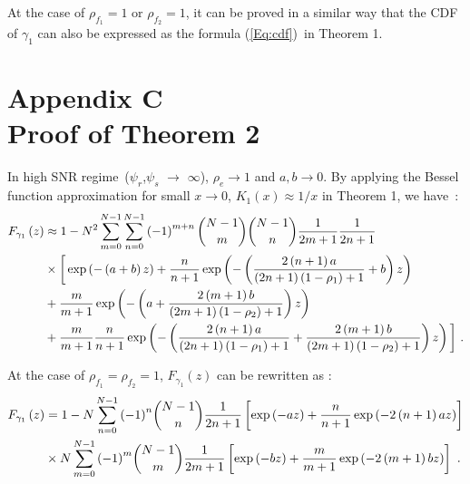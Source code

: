 \documentclass[onecolumn,letterpaper,11pt,draftclsnofoot]{IEEEtran}
\begin{document}
At the case of $\rho_{f_1}=1$ or $\rho_{f_2}=1$, it can be proved in
a similar way that the CDF of $\gamma_1$ can also be expressed as
the formula (\ref{Eq:cdf})~in Theorem 1.

\section*{Appendix C\\ Proof of Theorem 2 }

In high SNR regime~\big($\psi_r$,$\psi_s$ $\to$ $\infty$\big),
$\rho_e \to 1$ and $a,b \to 0$. By applying the Bessel function
approximation for small $x \to 0$, $K_1 \left( x \right) \approx
{1}/{x} $\cite{Abramowitz} in Theorem 1, we have~:
\begin{align}\label{Eq:hignFgamma}
F_{\gamma _1 }  \left( z \right) &\approx 1 - N^2 \sum\limits_{m =
0}^{N - 1} {\sum\limits_{n = 0}^{N - 1} {\left( { - 1} \right)^{m +
n} \binom{N-1}{m}} } \binom{N-1}{n}\frac{1}{{2m + 1}}\frac{1}{{2n +
1}}
\\\notag
&\times \bigg[\exp \left( { - \left( {a + b} \right)z} \right) +
\frac{n}{{n + 1}}\exp \left( { - \left( {\frac{{2\left( {n + 1}
\right)a}}{{\left( {2n + 1} \right)\left( {1 - \rho _1 } \right) +
1}} + b} \right)z} \right) \\\notag
 &+ \frac{m}{{m + 1}}\exp
\left( { - \left( {a + \frac{{2\left( {m + 1} \right)b}}{{\left( {2m
+ 1} \right)\left( {1 - \rho _2 } \right) + 1}}} \right)z}
\right)\\\notag
 &+ \frac{m}{{m + 1}}\frac{n}{{n + 1}}\exp
\left( { - \left( {\frac{{2\left( {n + 1} \right)a}}{{\left( {2n +
1} \right)\left( {1 - \rho _1 } \right) + 1}} + \frac{{2\left( {m +
1} \right)b}}{{\left( {2m + 1} \right)\left( {1 - \rho _2 } \right)
+ 1}}} \right)z} \right)\bigg]~.
\end{align}


At the case of $\rho_{f_1}=\rho_{f_2}=1$, $F_{\gamma _1 } \left( z
\right)$ can be rewritten as :
\begin{align}
F_{\gamma _1 } \left( z \right) &= 1 - N\sum\limits_{n = 0}^{N - 1}
{\left( { - 1} \right)^n } \binom{N-1}{n}\frac{1}{{2n + 1}}\left[
{\exp \left( { - az} \right) + \frac{n}{{n + 1}}\exp \left( { -
2\left( {n + 1} \right)az} \right)} \right]\\\notag &\times
N\sum\limits_{m = 0}^{N - 1} {\left( { - 1} \right)^m }
\binom{N-1}{m}\frac{1}{{2m + 1}}\left[ {\exp \left( { - bz} \right)
+ \frac{m}{{m + 1}}\exp \left( { - 2\left( {m + 1} \right)bz}
\right)} \right]~.
\end{align}
\end{document}
